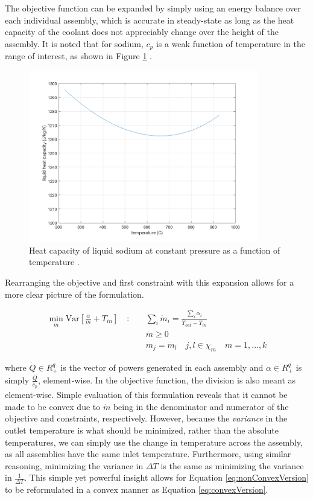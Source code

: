 \documentclass[11pt, oneside]{article}   	%
\newcommand{\Var}{\mathrm{Var}}
\begin{document}
The objective function can be expanded by simply using an energy balance over each individual assembly, which is accurate in steady-state as long as the heat capacity of the coolant does not appreciably change over the height of the assembly.
It is noted that for sodium, $c_p$ is a weak function of temperature in the range of interest, as shown in Figure \ref{fig:cp} \cite{SAS_sodiumCorrelations}.

\begin{figure}[h!]
\includegraphics[width=10cm]{sodiumHeatCapacity}
\centering
\caption{Heat capacity of liquid sodium at constant pressure as a function of temperature \cite{SAS_sodiumCorrelations}.}
\label{fig:cp}
\end{figure}

Rearranging the objective and first constraint with this expansion allows for a more clear picture of the formulation.

\begin{align} 
\min_{\dot{m}} \Var [\frac{\alpha}{\dot{m}} + T_{in}] \quad : \quad & \sum_i \dot{m}_i = \frac{\sum_i \alpha_i}{\bar{T}_{out}-T_{in}}  \label{eq:nonConvexVersion} \\ 
& \dot{m} \geq 0 \nonumber \\
& \dot{m}_j = \dot{m}_l \quad j,l \in \chi_m \quad m = 1, \dots, k \nonumber
\end{align}

where $\dot{Q} \in R^q_+$ is the vector of powers generated in each assembly and $\alpha \in R^q_+$ is simply $\frac{\dot{Q}}{c_p}$, element-wise.
In the objective function, the division is also meant as element-wise.
Simple evaluation of this formulation reveals that it cannot be made to be convex due to $\dot{m}$ being in the denominator and numerator of the objective and constraints, respectively.
However, because the \textit{variance} in the outlet temperature is what should be minimized, rather than the absolute temperatures, we can simply use the change in temperature across the assembly, as all assemblies have the same inlet temperature.
Furthermore, using similar reasoning, minimizing the variance in $\Delta T$ is the same as minimizing the variance in $\frac{1}{\Delta T}$.
This simple yet powerful insight allows for Equation \ref{eq:nonConvexVersion} to be reformulated in a convex manner as Equation \ref{eq:convexVersion}.
\end{document}
